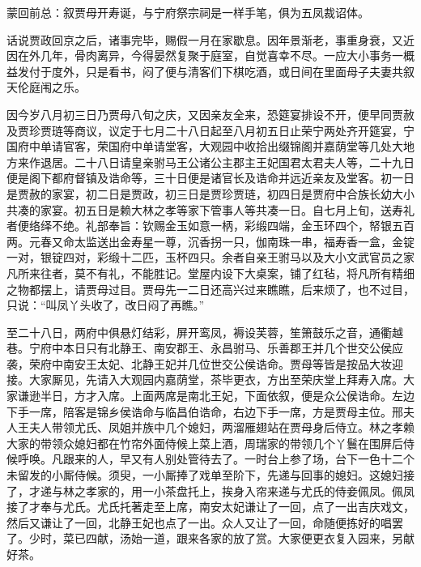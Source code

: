 

\begin{parag}
    \begin{note}蒙回前总：叙贾母开寿诞，与宁府祭宗祠是一样手笔，俱为五凤裁诏体。\end{note}
\end{parag}


\begin{parag}
    话说贾政回京之后，诸事完毕，赐假一月在家歇息。因年景渐老，事重身衰，又近因在外几年，骨肉离异，今得晏然复聚于庭室，自觉喜幸不尽。一应大小事务一概益发付于度外，只是看书，闷了便与清客们下棋吃酒，或日间在里面母子夫妻共叙天伦庭闱之乐。
\end{parag}


\begin{parag}
    因今岁八月初三日乃贾母八旬之庆，又因亲友全来，恐筵宴排设不开，便早同贾赦及贾珍贾琏等商议，议定于七月二十八日起至八月初五日止荣宁两处齐开筵宴，宁国府中单请官客，荣国府中单请堂客，大观园中收拾出缀锦阁并嘉荫堂等几处大地方来作退居。二十八日请皇亲驸马王公诸公主郡主王妃国君太君夫人等，二十九日便是阁下都府督镇及诰命等，三十日便是诸官长及诰命并远近亲友及堂客。初一日是贾赦的家宴，初二日是贾政，初三日是贾珍贾琏，初四日是贾府中合族长幼大小共凑的家宴。初五日是赖大林之孝等家下管事人等共凑一日。自七月上旬，送寿礼者便络绎不绝。礼部奉旨：钦赐金玉如意一柄，彩缎四端，金玉环四个，帑银五百两。元春又命太监送出金寿星一尊，沉香拐一只，伽南珠一串，福寿香一盒，金锭一对，银锭四对，彩缎十二匹，玉杯四只。余者自亲王驸马以及大小文武官员之家凡所来往者，莫不有礼，不能胜记。堂屋内设下大桌案，铺了红毡，将凡所有精细之物都摆上，请贾母过目。贾母先一二日还高兴过来瞧瞧，后来烦了，也不过目，只说：“叫凤丫头收了，改日闷了再瞧。”
\end{parag}


\begin{parag}
    至二十八日，两府中俱悬灯结彩，屏开鸾凤，褥设芙蓉，笙箫鼓乐之音，通衢越巷。宁府中本日只有北静王、南安郡王、永昌驸马、乐善郡王并几个世交公侯应袭，荣府中南安王太妃、北静王妃并几位世交公侯诰命。贾母等皆是按品大妆迎接。大家厮见，先请入大观园内嘉荫堂，茶毕更衣，方出至荣庆堂上拜寿入席。大家谦逊半日，方才入席。上面两席是南北王妃，下面依叙，便是众公侯诰命。左边下手一席，陪客是锦乡侯诰命与临昌伯诰命，右边下手一席，方是贾母主位。邢夫人王夫人带领尤氏、凤姐并族中几个媳妇，两溜雁翅站在贾母身后侍立。林之孝赖大家的带领众媳妇都在竹帘外面侍候上菜上酒，周瑞家的带领几个丫鬟在围屏后侍候呼唤。凡跟来的人，早又有人别处管待去了。一时台上参了场，台下一色十二个未留发的小厮侍候。须臾，一小厮捧了戏单至阶下，先递与回事的媳妇。这媳妇接了，才递与林之孝家的，用一小茶盘托上，挨身入帘来递与尤氏的侍妾佩凤。佩凤接了才奉与尤氏。尤氏托著走至上席，南安太妃谦让了一回，点了一出吉庆戏文，然后又谦让了一回，北静王妃也点了一出。众人又让了一回，命随便拣好的唱罢了。少时，菜已四献，汤始一道，跟来各家的放了赏。大家便更衣复入园来，另献好茶。
\end{parag}


